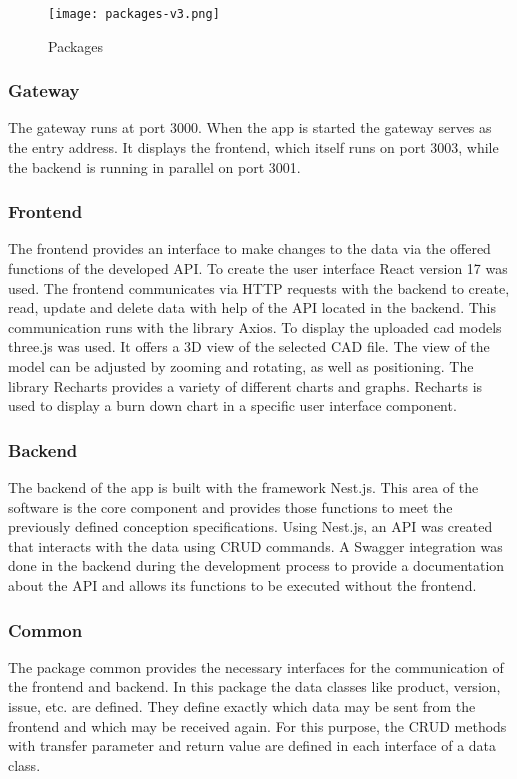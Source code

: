     \begin{figure}[h]
        \centering
        \texttt{[image: packages-v3.png]}
        \caption{Packages}
        \label{fig: packages}
    \end{figure}

    \subsubsection*{Gateway}
    The gateway runs at port 3000. When the app is started the gateway serves as the entry address. It displays the frontend, which itself runs on port 3003, while the backend is running in parallel on port 3001. 
  
    \subsubsection*{Frontend}
    The frontend provides an interface to make changes to the data via the offered functions of the developed API. To create the user interface React version 17 was used. The frontend communicates via HTTP requests with the backend to create, read, update and delete data with help of the API located in the backend. This communication runs with the library Axios. To display the uploaded cad models three.js was used. It offers a 3D view of the selected CAD file. The view of the model can be adjusted by zooming and rotating, as well as positioning. The library Recharts provides a variety of different charts and graphs. Recharts is used to display a burn down chart in a specific user interface component.

    \subsubsection*{Backend}
    The backend of the app is built with the framework Nest.js. This area of the software is the core component and provides those functions to meet the previously defined conception specifications. Using Nest.js, an API was created that interacts with the data using CRUD commands. A Swagger integration was done in the backend during the development process to provide a documentation about the API and allows its functions to be executed without the frontend.

    \subsubsection*{Common}
    The package common provides the necessary interfaces for the communication of the frontend and backend. In this package the data classes like product, version, issue, etc. are defined. They define exactly which data may be sent from the frontend and which may be received again. For this purpose, the CRUD methods with transfer parameter and return value are defined in each interface of a data class.
    
